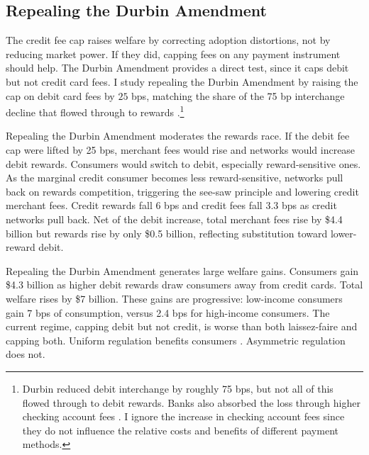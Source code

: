 \documentclass[main.tex]{subfiles}
\begin{document}
\subsection{Repealing the Durbin Amendment}
\label{subsec:repeal}

The credit fee cap raises welfare by correcting adoption distortions, not by reducing market power.
If they did, capping fees on any payment instrument should help.
The Durbin Amendment provides a direct test, since it caps debit but not credit card fees.
I study repealing the Durbin Amendment by raising the cap on debit card fees by $25$ bps, matching the share of the 75 bp interchange decline that flowed through to rewards \parencite{Hayashi2012}.\footnote{
    Durbin reduced debit interchange by roughly 75 bps, but not all of this flowed through to debit rewards.
    \label{foot:durbin-icg-vs-rewards}
    Banks also absorbed the loss through higher checking account fees \parencite{Kay.etal2018, Mukharlyamov.Sarin2025}.
    I ignore the increase in checking account fees since they do not influence the relative costs and benefits of different payment methods.
}

Repealing the Durbin Amendment moderates the rewards race.
If the debit fee cap were lifted by 25 bps, merchant fees would rise and networks would increase debit rewards.
Consumers would switch to debit, especially reward-sensitive ones.
As the marginal credit consumer becomes less reward-sensitive, networks pull back on rewards competition, triggering the see-saw principle and lowering credit merchant fees.
Credit rewards fall 6 bps and credit fees fall 3.3 bps as credit networks pull back.
Net of the debit increase, total merchant fees rise by \$4.4 billion but rewards rise by only \$0.5 billion, reflecting substitution toward lower-reward debit.

Repealing the Durbin Amendment generates large welfare gains.
Consumers gain \$4.3 billion as higher debit rewards draw consumers away from credit cards.
Total welfare rises by \$7 billion.
These gains are progressive: low-income consumers gain 7 bps of consumption, versus 2.4 bps for high-income consumers.
The current regime, capping debit but not credit, is worse than both laissez-faire and capping both.
Uniform regulation benefits consumers \parencite{Rochet.Tirole2011}. Asymmetric regulation does not.
\end{document}
